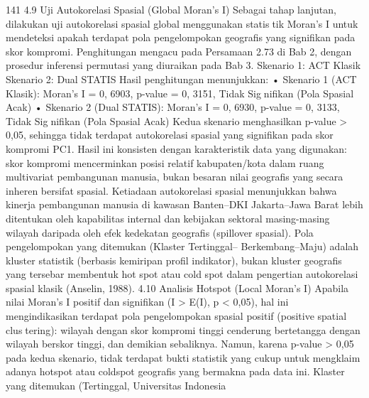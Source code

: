 141
4.9 Uji Autokorelasi Spasial (Global Moran’s I)
Sebagai tahap lanjutan, dilakukan uji autokorelasi spasial global menggunakan statistik Moran’s I untuk mendeteksi apakah terdapat pola pengelompokan geografis yang
signifikan pada skor kompromi. Penghitungan mengacu pada Persamaan 2.73 di Bab 2,
dengan prosedur inferensi permutasi yang diuraikan pada Bab 3.
Skenario 1: ACT Klasik
Skenario 2: Dual STATIS
Hasil penghitungan menunjukkan:
• Skenario 1 (ACT Klasik): Moran’s I = 0, 6903, p-value = 0, 3151, Tidak Signifikan (Pola Spasial Acak)
• Skenario 2 (Dual STATIS): Moran’s I = 0, 6930, p-value = 0, 3133, Tidak Signifikan (Pola Spasial Acak)
Kedua skenario menghasilkan p-value > 0,05, sehingga tidak terdapat autokorelasi
spasial yang signifikan pada skor kompromi PC1. Hasil ini konsisten dengan karakteristik
data yang digunakan: skor kompromi mencerminkan posisi relatif kabupaten/kota dalam
ruang multivariat pembangunan manusia, bukan besaran nilai geografis yang secara inheren
bersifat spasial. Ketiadaan autokorelasi spasial menunjukkan bahwa kinerja pembangunan
manusia di kawasan Banten–DKI Jakarta–Jawa Barat lebih ditentukan oleh kapabilitas
internal dan kebijakan sektoral masing-masing wilayah daripada oleh efek kedekatan
geografis (spillover spasial). Pola pengelompokan yang ditemukan (Klaster Tertinggal–
Berkembang–Maju) adalah kluster statistik (berbasis kemiripan profil indikator), bukan
kluster geografis yang tersebar membentuk hot spot atau cold spot dalam pengertian
autokorelasi spasial klasik (Anselin, 1988).
4.10 Analisis Hotspot (Local Moran’s I)
Apabila nilai Moran’s I positif dan signifikan (I > E(I), p < 0,05), hal ini
mengindikasikan terdapat pola pengelompokan spasial positif (positive spatial clustering): wilayah dengan skor kompromi tinggi cenderung bertetangga dengan wilayah
berskor tinggi, dan demikian sebaliknya. Namun, karena p-value > 0,05 pada kedua
skenario, tidak terdapat bukti statistik yang cukup untuk mengklaim adanya hotspot atau
coldspot geografis yang bermakna pada data ini. Klaster yang ditemukan (Tertinggal,
Universitas Indonesia

